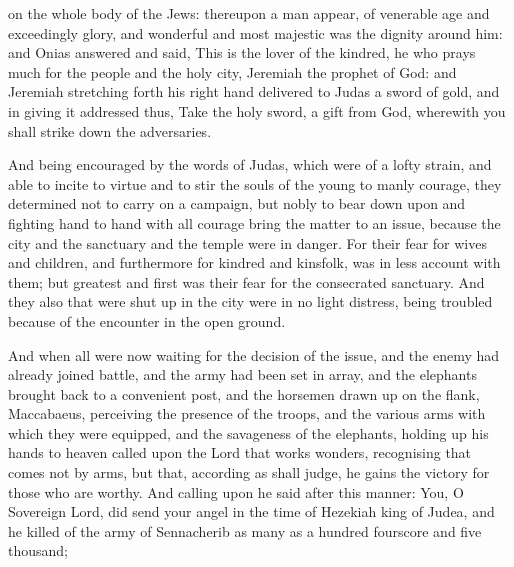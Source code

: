 {{} on the whole body of the Jews:
thereupon
{} a man appear, of venerable age and exceedingly glory, and wonderful and most majestic was the dignity around him:
and Onias answered and said, This is the lover of the kindred, he who prays much for the people and the holy city, Jeremiah the prophet of God:
and Jeremiah stretching forth his right hand delivered to Judas a sword of gold, and in giving it addressed
{} thus,
Take the holy sword, a gift from God, wherewith you shall strike down the adversaries.
\par }{\PP {}And being encouraged by the words of Judas, which were of a lofty strain, and able to incite to virtue and to stir the souls of the young to manly courage, they determined
 not to carry on a campaign, but nobly to bear down upon
{} and fighting hand to hand with all courage bring the matter to an issue, because the city and the sanctuary and the temple were in danger.
For their fear for wives and children, and furthermore for kindred and kinsfolk, was in less account with them; but greatest and first was their fear for the consecrated sanctuary.
And they also that were shut up in the city were in no light distress, being troubled because of the encounter in the open ground.
\par }{\PP {}And when all were now waiting for the decision of the issue, and the enemy had already joined battle, and the army had been set in array, and the
 elephants
 brought back to a convenient post, and the horsemen drawn up
 on the flank,
Maccabaeus, perceiving the presence of the
 troops, and the various arms with which they were equipped, and the savageness of the
 elephants, holding up his hands to heaven called upon the Lord that works wonders, recognising that
{} comes not by arms, but that, according as
{} shall judge, he gains the victory for those who are worthy.
And calling upon
{} he said after this manner: You, O Sovereign Lord, did send your angel in the time of Hezekiah king of Judea, and he killed of the
 army of Sennacherib as many as a hundred fourscore and five thousand;
}
